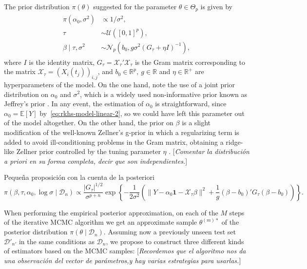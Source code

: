 \documentclass[ba]{imsart}
\numberwithin{equation}{section}
\theoremstyle{plain}
\newcommand{\R}{\mathbb{R}}
\newcommand{\E}{\mathbb{E}}
\newenvironment{comment}[1][comment-red]
{
\noindent \color{#1}
}
{
\color{black}
}
\newcommand\incomment[2][comment-red]{\color{#1}[\textit{#2}]\color{black}}
\begin{document}
The prior distribution \(\pi(\theta)\) suggested for the parameter \(\theta \in \Theta_p\) is given by
\begin{align}\label{eq:prior-linear}
  \begin{split}
  \pi(\alpha_0, \sigma^2)              & \propto 1/\sigma^2,                                                     \\
  \tau                     & \sim \mathcal U([0, 1]^p),                                              \\
  \beta\mid \tau, \sigma^2 & \sim \mathcal N_p(b_0, g\sigma^2(G_\tau + \eta I)^{-1}),
\end{split}
\end{align}
where \(I\) is the identity matrix, \(G_\tau = \mathcal X_\tau'\mathcal X_\tau\) is the Gram matrix corresponding to the matrix \(\mathcal X_\tau = (X_i(t_j))_{i,j}\), and \(b_0\in \R^p, \ g \in \R\) and \(\eta \in \R^+\) are hyperparameters of the model. On the one hand, note the use of a joint prior distribution on \(\alpha_0\) and \(\sigma^2\), which is a widely used non-informative prior known as Jeffrey's prior \citep{jeffreys1946invariant}. In any event, the estimation of \(\alpha_0\) is straightforward, since \(\alpha_0 = \E[Y]\) by~\eqref{eq:rkhs-model-linear-2}, so we could have left this parameter out of the model altogether. On the other hand, the prior on \(\beta\) is a slight modification of the well-known Zellner's g-prior \citep{zellner1986assessing} in which a regularizing term is added to avoid ill-conditioning problems in the Gram matrix, obtaining a ridge-like Zellner prior controlled by the tuning parameter \(\eta\) \citep{baragatti2012study}. \incomment{Comentar la distribución a priori en su forma completa, decir que son independientes.}

\begin{comment}
Pequeña proposición con la cuenta de la posteriori
\[
\pi(\beta, \tau, \alpha_0, \log\sigma\mid \mathcal D_n) \propto \frac{|G_\tau|^{1/2}}{\sigma^{p+n}} \exp\left\{ -\frac{1}{2\sigma^2} \left(\|Y- \alpha_0\boldsymbol{1} - \mathcal X_\tau\beta\|^2 + \frac{1}{g}(\beta - b_0)'G_\tau(\beta - b_0) \right) \right\}.
\]

\end{comment}

When performing the empirical posterior approximation, on each of the \(M\) steps of the iterative MCMC algorithm we get an approximate sample \(\theta^{(m)*}\) of the posterior distribution \(\pi(\theta\mid \mathcal D_n)\). Assuming now a previously unseen test set \(\mathcal D'_{n'}\) in the same conditions as \(\mathcal D_n\), we propose to construct three different kinds of estimators based on the MCMC samples: \incomment{Recordemos que el algoritmo nos da una observación del vector de parámetros,y hay varias estrategias para usarlas.}
\end{document}
